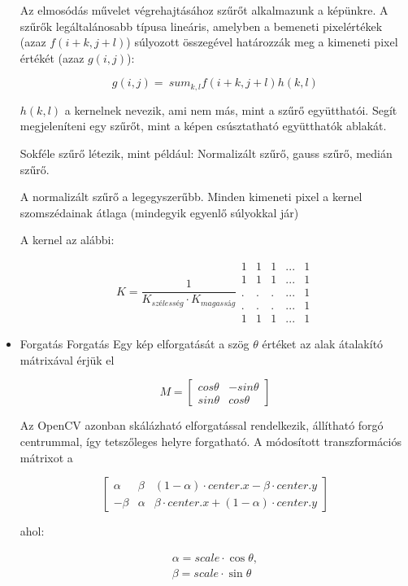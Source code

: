 \begin{itemize}
Az elmosódás művelet végrehajtásához szűrőt alkalmazunk a képünkre. A szűrők legáltalánosabb típusa lineáris, amelyben a bemeneti pixelértékek (azaz $f(i+k, j+l)$) súlyozott összegével határozzák meg a kimeneti pixel értékét (azaz $g(i, j)$):

\[g (i, j) = \ sum_ {k, l} f (i + k, j + l) h (k, l)\]

$h(k, l)$ a kernelnek nevezik, ami nem más, mint a szűrő együtthatói. Segít megjeleníteni egy szűrőt, mint a képen csúsztatható együtthatók ablakát.

Sokféle szűrő létezik, mint például: Normalizált szűrő, gauss szűrő, medián szűrő.

A normalizált szűrő a legegyszerűbb. Minden kimeneti pixel a kernel szomszédainak átlaga (mindegyik egyenlő súlyokkal jár)

A kernel az alábbi:

\[K = \dfrac{1}{K_{szélesség} \cdot K_{magasság}}
\begin{matrix}
    1 & 1 & 1 & ... & 1 \\
    1 & 1 & 1 & ... & 1 \\
    . &. &. & ... & 1 \\
    . &. &. & ... & 1 \\
    1 & 1 & 1 & ... & 1   
\end{matrix}
\]
\item Forgatás
Forgatás
Egy kép elforgatását a szög $\theta$ értéket az alak átalakító mátrixával érjük el

$$M = \begin{bmatrix} cos\theta & -sin\theta \\ sin\theta & cos\theta   \end{bmatrix}$$

Az OpenCV azonban skálázható elforgatással rendelkezik, állítható forgó centrummal, így tetszőleges helyre forgatható. A módosított transzformációs mátrixot a

$$\begin{bmatrix}
\alpha &  \beta & (1- \alpha )  \cdot center.x -  \beta \cdot center.y \\ - \beta &  \alpha &  \beta \cdot center.x + (1- \alpha )  \cdot center.y
\end{bmatrix}$$

ahol:

$$\begin{array}{l}
\alpha =  scale \cdot \cos \theta , \\ \beta =  scale \cdot \sin \theta
\end{array}$$


\end{itemize}
